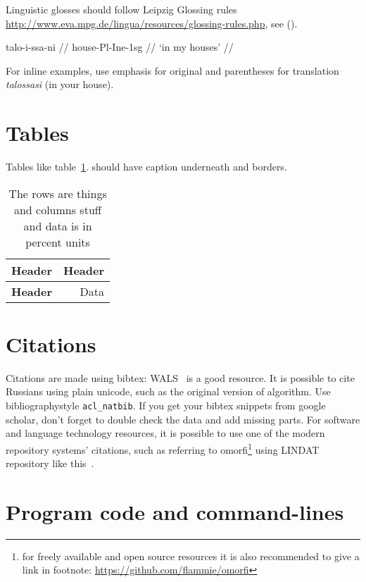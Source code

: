 \documentclass[a4paper,notitlepage]{article}
\begin{document}
Linguistic glosses should follow Leipzig Glossing rules
\url{http://www.eva.mpg.de/lingua/resources/glossing-rules.php}, see (\nextx).

\ex
\begingl
\gla talo-i-ssa-ni //
\glb house-{\sc Pl}-{\sc Ine}-{\sc 1sg} //
\glft `in my houses' //
\endgl
\xe

For inline examples, use emphasis for original and parentheses for translation
\emph{talossasi} (in your house).


\section{Tables}

Tables like table~\ref{table:example}. should have caption underneath and
borders.

\begin{table}
    \center
    \begin{tabular}{|l|r|}
        \hline
        \bf Header & \bf Header \\
        \hline
        \bf Header & Data \\
        \hline
    \end{tabular}
    \caption{The rows are things and columns stuff and data is in percent units
    \label{table:example}}
\end{table}

\section{Citations}

Citations are made using bibtex: WALS~\citep{haspelmath2005world} is a good
resource.  It is possible to cite Russians using plain unicode, such as the
original version of \citet{levenshtein1965} algorithm.  Use bibliographystyle
\texttt{acl\_natbib}. If you get your bibtex snippets from google scholar, don't
forget to double check the data and add missing parts.  For software and
language technology resources, it is possible to use one of the modern
repository systems' citations, such as referring to omorfi\footnote{for freely
available and open source resources it is also recommended to give a link in
footnote: \url{https://github.com/flammie/omorfi}} using LINDAT repository like
this~\citep{omorfi}.

\section{Program code and command-lines}
\end{document}
